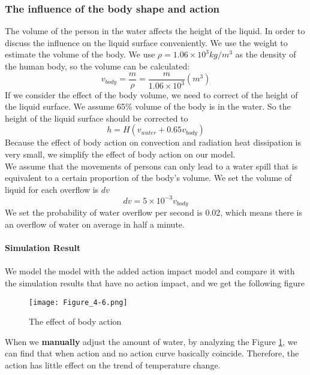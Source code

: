 \documentclass{mcmthesis}
\begin{document}
\subsubsection{The influence of the body shape and action}
The volume of the person in the water affects the height of the liquid. In order to discuss the influence on the liquid surface conveniently. We use the weight to estimate the volume of the body. We use $\rho =1.06\times10^{3}kg/m^{3}$ as the density of the human body, so the volume can be calculated:
\begin{equation}
v_{body}=\frac{m}{\rho }=\frac{m}{1.06\times 10^{3}}(m^{3})
\end{equation}
\indent If we consider the effect of the body volume, we need to correct of the height of the liquid surface. We assume 65\% volume of the body is in the water. So the height of the liquid surface should be corrected to\\
\begin{equation}
	h=H(v_{water}+0.65v_{body})
\end{equation}
\indent Because the effect of body action on convection and radiation heat dissipation is very small, we simplify the effect of body action on our model.\\
\indent We assume that the movements of persons can only lead to a water spill that is equivalent to a certain proportion of the body's volume. We set the volume of liquid for each overflow is $dv$
\begin{equation}
	dv=5\times10^{-3}v_{body}
\end{equation}
\indent We set the probability of water overflow per second is 0.02, which means there is an overflow of water on average in half a minute.\\\\
\noindent
\textbf{Simulation Result}\\\\
\indent We model the model with the added action impact model and compare it with the simulation results that have no action impact, and we get the following figure
\begin{figure}[H]
	\centerline{\texttt{[image: Figure\_4-6.png]}}
	\caption{The effect of body action}
	\label{action}	
\end{figure}

When we \textbf{manually} adjust the amount of water, by analyzing the Figure \ref{action}, we can find that when action and no action curve basically coincide. Therefore, the action has little effect on the trend of temperature change.\\
\end{document}
